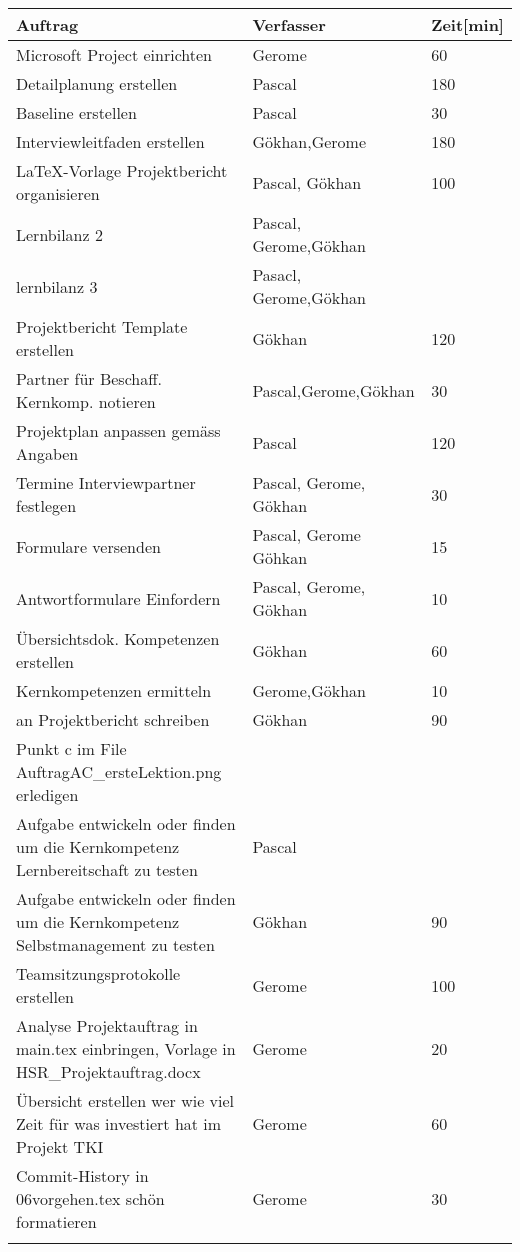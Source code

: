  \begin{tabular}{ | p{7cm} | p{4cm} | p{2cm} |}
   \hline
   \textbf{Auftrag} & \textbf{Verfasser} & \textbf{Zeit[min]}   \\
   \hline  		
    Microsoft Project einrichten & Gerome & 60 \\ \hline
    Detailplanung erstellen & Pascal & 180 \\ \hline
    Baseline erstellen  & Pascal & 30 \\ \hline
    Interviewleitfaden erstellen& Gökhan,Gerome & 180 \\ \hline
    LaTeX-Vorlage Projektbericht organisieren & Pascal, Gökhan & 100 \\ \hline
    Lernbilanz 2 & Pascal, Gerome,Gökhan & \\ \hline
    lernbilanz 3 & Pasacl, Gerome,Gökhan &  \\ \hline
    Projektbericht Template erstellen & Gökhan & 120 \\ \hline
    Partner für Beschaff. Kernkomp. notieren & Pascal,Gerome,Gökhan & 30 \\ \hline
    Projektplan anpassen gemäss Angaben & Pascal & 120 \\ \hline
    Termine Interviewpartner festlegen & Pascal, Gerome, Gökhan & 30 \\ \hline
    Formulare versenden & Pascal, Gerome Göhkan & 15 \\ \hline
    Antwortformulare Einfordern & Pascal, Gerome, Gökhan & 10 \\ \hline
    Übersichtsdok. Kompetenzen erstellen & Gökhan & 60 \\ \hline    
    Kernkompetenzen ermitteln & Gerome,Gökhan & 10 \\ \hline   
    an Projektbericht schreiben & Gökhan & 90 \\ \hline   
    Punkt c im File AuftragAC\_ersteLektion.png erledigen &  &  \\ \hline    
    Aufgabe entwickeln oder finden um die Kernkompetenz Lernbereitschaft zu testen  & Pascal &  \\ \hline   
    Aufgabe entwickeln oder finden um die Kernkompetenz Selbstmanagement zu testen  & Gökhan & 90 \\ \hline  
    Teamsitzungsprotokolle erstellen & Gerome & 100 \\ \hline    
    Analyse Projektauftrag in main.tex einbringen, Vorlage in HSR\_Projektauftrag.docx & Gerome & 20\\ \hline   
    Übersicht erstellen wer wie viel Zeit für was investiert hat im Projekt TKI & Gerome & 60\\ \hline   
    Commit-History in 06vorgehen.tex schön formatieren & Gerome & 30 \\ \hline 
     &  &  \\ \hline   
\end{tabular}